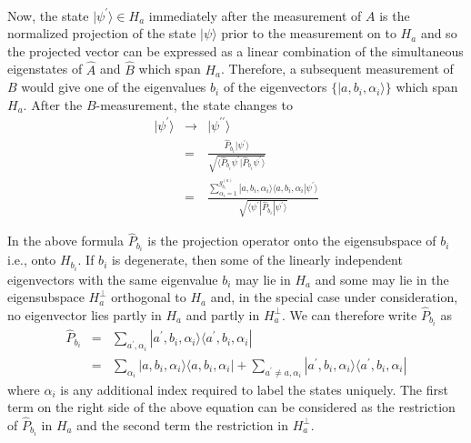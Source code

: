 \paragraph{}
Now, the state $|\psi^{\prime}\rangle \in H_a$ immediately after the measurement of $A$ is the normalized projection
of the state $|\psi\rangle$ prior to the measurement on to $H_a$ and so the projected vector can be expressed as a linear combination of the simultaneous eigenstates of 
$\hat{A}$ and $\hat{B}$ which span $H_a$. Therefore, a subsequent measurement of $B$ would 
give one of the eigenvalues $b_i$ of the eigenvectors $\{|a,b_i,\alpha_i\rangle\}$ which span $H_a$. After the $B$-measurement, the state changes to
\begin{eqnarray}
|\psi^{\prime}\rangle & \rightarrow & |\psi^{\prime \prime}\rangle \nonumber \\
                      & = & \frac{\hat{P}_{b_i} |\psi^{\prime}\rangle}{\sqrt{\langle \hat{P}_{b_i}\psi^{\prime}|
											       \hat{P}_{b_i}\psi^{\prime}\rangle}} \nonumber \\
											& = & \frac{ \sum_{\alpha_i=1}^{g^{(a)}_{b_i}} |a,b_i,\alpha_i\rangle\langle a,b_i,\alpha_i|\psi^{\prime}			                        \rangle }
											{ \sqrt{\langle \psi^{\prime}|\hat{P}_{b_i}|\psi^{\prime}\rangle}}
\end{eqnarray}											

In the above formula $\hat{P}_{b_i}$ is the projection operator onto the eigensubspace of
$b_i$ i.e., onto $H_{b_i}$. If $b_i$ is degenerate, then some of the linearly independent eigenvectors with the same eigenvalue
$b_i$ may lie in $H_a$ and some may lie in the eigensubspace $H_a^{\bot}$ orthogonal to $H_a$ and, in the special case
under consideration, no eigenvector lies partly in
$H_a$ and partly in $H_a^{\bot}$.  We can therefore write $\hat{P}_{b_i}$ as
\begin{eqnarray}
\hat{P}_{b_i} & =& \sum_{a^{\prime},\alpha_i} |a^{\prime},b_i, \alpha_i\rangle \langle a^{\prime},b_i, \alpha_i| \nonumber \\ 
              &=&\sum_{\alpha_i} |a,b_i, \alpha_i\rangle \langle a,b_i, \alpha_i| +  
							\sum_{a^{\prime} \neq a, \alpha_i} |a^{\prime},b_i, \alpha_i\rangle \langle a^{\prime},b_i, \alpha_i|
\label{eq:projection2}
\end{eqnarray}
where $\alpha_i$ is any additional index required to label the states uniquely.
The first term on the right side of the above equation can be considered as the restriction of $\hat{P}_{b_i}$ in
$H_a$ and the second term the restriction in $H_a^{\bot}$.


